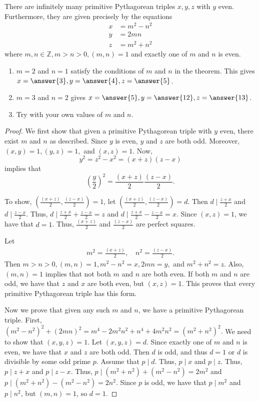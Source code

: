 \documentclass{ximera}
\begin{document}
\begin{theorem}[Theorem 6.3]\label{thm:form-pyth-trip}
	There are infinitely many primitive Pythagorean triples $x,y,z$ with $y$ even. Furthermore, they are given precisely by the equations
   \begin{align*}
	x&=m^2-n^2\\
	y&=2mn\\
	z&=m^2+n^2
   \end{align*}
   where $m,n\in\mathbb{Z}, m>n>0, (m,n)=1$ and exactly one of $m$ and $n$ is even.
\end{theorem}

\begin{example}

\begin{enumerate}
	\item $m=2$ and $n=1$ satisfy the conditions of $m$ and $n$ in the theorem. This gives $x=\answer{3}, y=\answer{4},z=\answer{5}$.
	\item $m=3$ and $n=2$ gives $x=\answer{5},y=\answer{12}, z=\answer{13}$.
	\item Try with your own values of $m$ and $n$.
   \end{enumerate}
\end{example}
   \begin{proof}
	We first show that given a primitive Pythagorean triple with $y$ even, there exist $m$ and $n$ as described. Since $y$ is  even, $y$ and $z$ are both odd. Moreover, $(x,y)=1,(y,z)=1,$ and $(x,z)=1$. Now,
	\[y^2=z^2-x^2=(x+z)(z-x)\] implies that \[\left(\frac{y}{2}\right)^2=\frac{(x+z)}{2}\frac{(z-x)}{2}.\]
	 
	To show, $\left(\frac{(x+z)}{2},\frac{(z-x)}{2}\right)=1$, let $\left(\frac{(x+z)}{2},\frac{(z-x)}{2}\right)=d.$ Then $d\mid\frac{z+x}{2}$ and $d\mid\frac{z-x}{2}$. Thus, $d\mid\frac{z+x}{2}+\frac{z-x}{2}=z$ and $d\mid\frac{z+x}{2}-\frac{z-x}{2}=x$. Since $(x,z)=1$, we have that $d=1$. Thus, $\frac{(x+z)}{2}$ and $\frac{(z-x)}{2}$ are perfect squares.
	 
	Let \begin{align*}m^2=\frac{(x+z)}{2},\quad n^2=\frac{(z-x)}{2}.\end{align*}
	Then $m>n>0, (m,n)=1, m^2-n^2=x, 2mn=y,$ and $m^2+n^2=z.$ Also, $(m,n)=1$ implies that not both $m$ and $n$ are both even. If both $m$ and $n$  are odd, we have that $z$ and $x$ are both even, but $(x,z)=1$. This proves that every primitive Pythagorean triple has this form.
	 
	Now we prove that given any such $m$ and $n$, we have a primitive Pythagorean triple. First, $(m^2-n^2)^2+
   (2mn)^2=m^4-2m^2n^2+n^4+4m^2n^2=(m^2+n^2)^2.$ We need to show that $(x,y,z)=1$. Let $(x,y,z)=d$. Since exactly one of $m$ and $n$ is even, we have that $x$ and $z$ are both odd. Then $d$ is odd, and thus $d=1$ or $d$ is divisible by some odd prime $p$. Assume that $p\mid d$. Thus, $p\mid x$ and $p\mid z$. Thus, $p\mid z+x$ and $p\mid z-x$. Thus, $p\mid (m^2+n^2)+(m^2-n^2)=2m^2$ and $p\mid (m^2+n^2)-(m^2-n^2)=2n^2.$ Since $p$ is odd, we have that $p\mid m^2$ and $p\mid n^2$, but  $(m,n)=1$, so $d=1$.
\end{proof}
\end{document}

